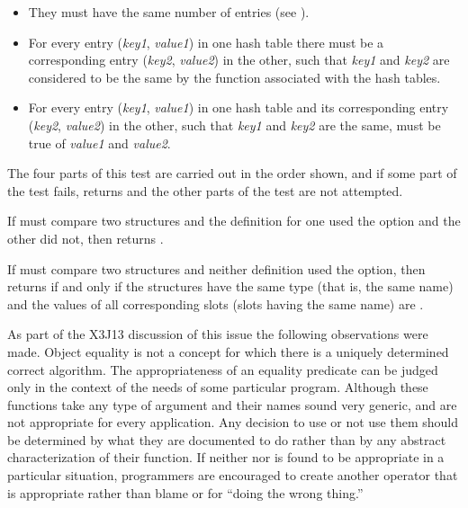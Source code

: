 \begin{defun}[Function]
\begin{new}
\begin{itemize}
\item They must have the same number of entries (see ).

\item For every entry (\emph{key1}, \emph{value1\/}) in one hash table
there must be a corresponding entry (\emph{key2}, \emph{value2\/}) in the
other, such that \emph{key1} and \emph{key2} are considered to be the same
by the  function associated with the hash tables.

\item For every entry (\emph{key1}, \emph{value1\/}) in one hash table
and its corresponding entry (\emph{key2}, \emph{value2\/}) in the
other, such that \emph{key1} and \emph{key2} are the same,
 must be true of \emph{value1} and \emph{value2}.
\end{itemize}
The four parts of this test are carried out in the order shown, and
if some part of the test fails,  returns  and
the other parts of the test are not attempted.

If  must compare two structures and the 
definition for one used the  option and the other did not,
then  returns .

If  must compare two structures and neither 
definition used the  option,
then  returns  if and only if the structures have the
same type (that is, the same  name) and the values
of all corresponding slots (slots having the same name) are .

As part of the X3J13 discussion of this issue
the following observations were made.
    Object equality is not a concept for which there is a uniquely
    determined correct algorithm. The appropriateness of an equality
    predicate can be judged only in the context of the needs of some
    particular program. Although these functions take any type of
    argument and their names sound very generic,  and  are
    not appropriate for every application. Any decision to use or not
    use them should be determined by what they are documented to do
    rather than by any abstract characterization of their function. If
    neither  nor  is found to be appropriate in a particular
    situation, programmers are encouraged to create another operator
    that is appropriate rather than blame  or  for ``doing
    the wrong thing.''
\end{new}


\end{defun}
